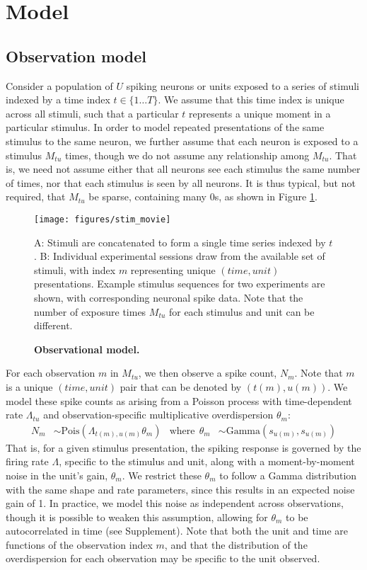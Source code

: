 \documentclass[12pt,a4paper]{article}
\begin{document}
\section*{Model}
\label{model_sec}

\subsection*{Observation model}
Consider a population of $U$ spiking neurons or units exposed to a series of stimuli indexed by a time index $t\in \lbrace 1\ldots T\rbrace$. We assume that this time index is unique across all stimuli, such that a particular $t$ represents a unique moment in a particular stimulus. In order to model repeated presentations of the same stimulus to the same neuron, we further assume that each neuron is exposed to a stimulus $M_{tu}$ times, though we do not assume any relationship among $M_{tu}$. That is, we need not assume either that all neurons see each stimulus the same number of times, nor that each stimulus is seen by all neurons. It is thus typical, but not required, that $M_{tu}$ be sparse, containing many 0s, as shown in Figure \ref{fig:movie}.

\begin{figure}[!ht]
    \texttt{[image: figures/stim\_movie]}
	\caption{\bf Observational model.}
    A: Stimuli are concatenated to form a single time series indexed by $t$. B: Individual experimental sessions draw from the available set of stimuli, with index $m$ representing unique $(time, unit)$ presentations. Example stimulus sequences for two experiments are shown, with corresponding neuronal spike data. Note that the number of exposure times $M_{tu}$ for each stimulus and unit can be different.
	\label{fig:movie}
\end{figure}

For each observation $m$ in $M_{tu}$, we then observe a spike count, $N_m$. Note that $m$ is a unique $(time, unit)$ pair that can be denoted by $(t(m), u(m))$. We model these spike counts as arising from a Poisson process with time-dependent rate $\Lambda_{tu}$ and observation-specific multiplicative overdispersion $\theta_m$:
\begin{align}
    \label{obs_model}
    N_{m} &\sim \text{Pois}(\Lambda_{t(m), u(m)} \theta_m) &
    \text{where} ~~ \theta_m &\sim \text{Gamma}(s_{u(m)}, s_{u(m)})
\end{align}
That is, for a given stimulus presentation, the spiking response is governed by the firing rate $\Lambda$, specific to the stimulus and unit, along with a moment-by-moment noise in the unit's gain, $\theta_m$. We restrict these $\theta_m$ to follow a Gamma distribution with the same shape and rate parameters, since this results in an expected noise gain of 1. In practice, we model this noise as independent across observations, though it is possible to weaken this assumption, allowing for $\theta_m$ to be autocorrelated in time (see Supplement). Note that both the unit and time are functions of the observation index $m$, and that the distribution of the overdispersion for each observation may be specific to the unit observed.
\end{document}

